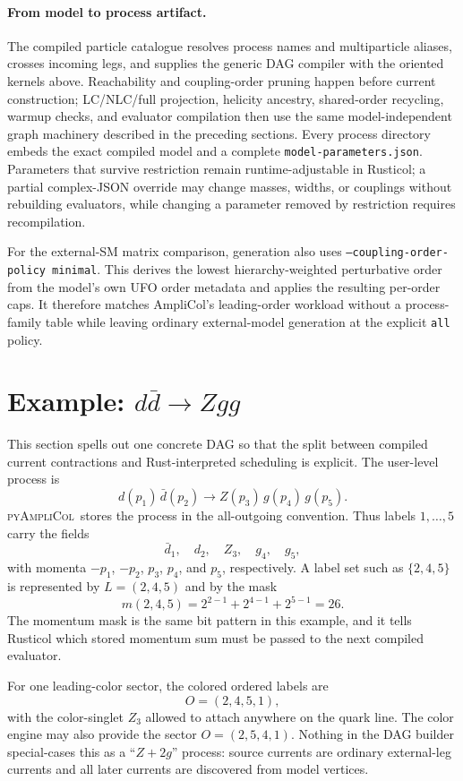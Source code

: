 \documentclass[10pt]{article}
\newcommand{\PAC}{\textsc{pyAmpliCol}}
\begin{document}
\paragraph{From model to process artifact.}
The compiled particle catalogue resolves process names and multiparticle
aliases, crosses incoming legs, and supplies the generic DAG compiler with the
oriented kernels above.  Reachability and coupling-order pruning happen before
current construction; LC/NLC/full projection, helicity ancestry, shared-order
recycling, warmup checks, and evaluator compilation then use the same
model-independent graph machinery described in the preceding sections.  Every
process directory embeds the exact compiled model and a complete
\texttt{model-parameters.json}.  Parameters that survive restriction remain
runtime-adjustable in Rusticol; a partial complex-JSON override may change
masses, widths, or couplings without rebuilding evaluators, while changing a
parameter removed by restriction requires recompilation.

For the external-SM matrix comparison, generation also uses
\texttt{--coupling-order-policy minimal}.  This derives the lowest
hierarchy-weighted perturbative order from the model's own UFO order metadata
and applies the resulting per-order caps.  It therefore matches AmpliCol's
leading-order workload without a process-family table while leaving ordinary
external-model generation at the explicit \texttt{all} policy.

\section{Example: \texorpdfstring{$d\bar d\to Zgg$}{d dbar -> Z g g}}

This section spells out one concrete DAG so that the split between compiled
current contractions and Rust-interpreted scheduling is explicit.  The
user-level process is
\[
  d(p_1)\,\bar d(p_2)\to Z(p_3)\,g(p_4)\,g(p_5).
\]
\PAC\ stores the process in the all-outgoing convention.  Thus labels
$1,\ldots,5$ carry the fields
\[
  \bar d_1,\quad d_2,\quad Z_3,\quad g_4,\quad g_5,
\]
with momenta $-p_1$, $-p_2$, $p_3$, $p_4$, and $p_5$, respectively.  A
label set such as $\{2,4,5\}$ is represented by
$L=(2,4,5)$ and by the mask
\[
  m(2,4,5)=2^{2-1}+2^{4-1}+2^{5-1}=26.
\]
The momentum mask is the same bit pattern in this example, and it tells
Rusticol which stored momentum sum must be passed to the next compiled
evaluator.

For one leading-color sector, the colored ordered labels are
\[
  O=(2,4,5,1),
\]
with the color-singlet $Z_3$ allowed to attach anywhere on the quark line.
The color engine may also provide the sector $O=(2,5,4,1)$.  Nothing in the
DAG builder special-cases this as a ``$Z+2g$'' process: source currents are
ordinary external-leg currents and all later currents are discovered from
model vertices.
\end{document}
